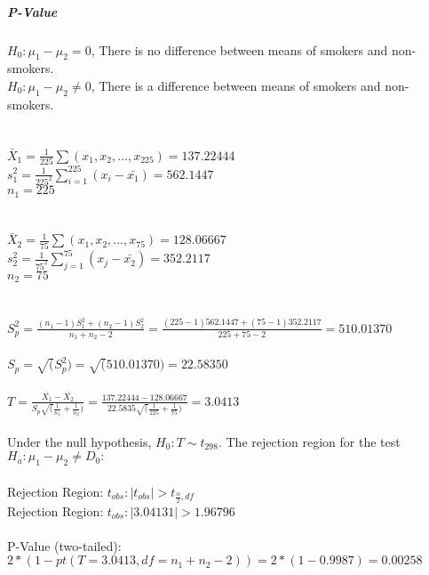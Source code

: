 \documentclass[
]{article}
\begin{document}
\hypertarget{p-value}{%
\subparagraph{\texorpdfstring{\textbf{P-Value}}{P-Value}}\label{p-value}}

\hfill\break
\(H_{0}: \mu_{1}-\mu_{2} = 0\), There is no difference between means of
smokers and non-smokers.\\
\(H_{0}: \mu_{1}-\mu_{2} ≠ 0\), There is a difference between means of
smokers and non-smokers.\\
~\\
~\\
\(\bar{X}_{1} = \frac{1}{225}\sum(x_{1},x_{2},...,x_{225}) = 137.22444\)\\
\(s^2_{1} = \frac{1}{225^2}\sum^{225}_{i=1}(x_{i}-\bar{x_{1}}) = 562.1447\)\\
\(n_{1} = 225\)\\
~\\
~\\
\(\bar{X}_{2} = \frac{1}{75}\sum(x_{1},x_{2},...,x_{75}) = 128.06667\)\\
\(s^2_{2} = \frac{1}{75^2}\sum^{75}_{j=1}(x_{j}-\bar{x_{2}}) = 352.2117\)\\
\(n_{2} = 75\)\\
~\\
~\\
\(S^2_{p} = \frac{(n_{1}-1)S^2_{1}+(n_{2}-1)S^2_{2}}{n_{1}+n_{2}-2} = \frac{(225-1)562.1447+(75-1)352.2117}{225+75-2} = 510.01370\)\\
~\\
\(S_{p} = \sqrt(S^2_{p}) = \sqrt(510.01370) = 22.58350\)\\
~\\
\(T = \frac{\bar{X_{1}} - \bar{X_{2}}} {S_{p}\sqrt(\frac{1}{n_{1}}+\frac{1}{n_{2}})} = \frac{137.22444 - 128.06667} {22.5835\sqrt(\frac{1}{225}+\frac{1}{75})} = 3.0413\)\\
~\\
Under the null hypothesis, \(H_{0}: T \sim t_{298}\). The rejection
region for the test \(H_{a}: \mu_{1}-\mu_{2} ≠ D_{0}:\)\\
~\\
Rejection Region: \({t_{obs} : |t_{obs}| > t_{\frac{\alpha}{2},df}}\)\\
Rejection Region: \({t_{obs} : |3.04131| > 1.96796}\)\\
~\\
P-Value (two-tailed):\\
\(2*(1-pt(T = 3.0413,df = n_{1}+n_{2}-2)) = 2*(1-0.9987) = 0.00258\)\\
~\\
\end{document}
